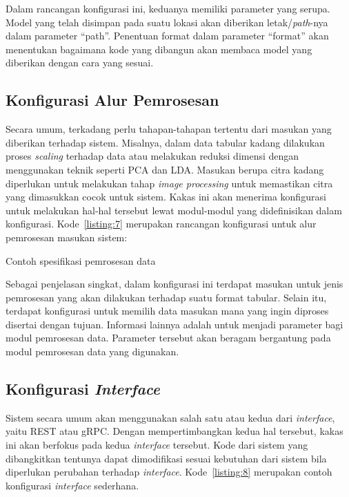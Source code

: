 Dalam rancangan konfigurasi ini, keduanya memiliki parameter yang serupa.
Model yang telah disimpan pada suatu lokasi akan diberikan letak/\textit{path}-nya dalam parameter ``path''.
Penentuan format dalam parameter ``format'' akan menentukan bagaimana kode yang dibangun akan membaca model yang diberikan dengan cara yang sesuai.

\subsection{Konfigurasi Alur Pemrosesan}\label{section:03-processing-pipeline}

Secara umum, terkadang perlu tahapan-tahapan tertentu dari masukan yang diberikan terhadap sistem.
Misalnya, dalam data tabular kadang dilakukan proses \textit{scaling} terhadap data atau melakukan reduksi dimensi dengan menggunakan teknik seperti PCA dan LDA.\@
Masukan berupa citra kadang diperlukan untuk melakukan tahap \textit{image processing} untuk memastikan citra yang dimasukkan cocok untuk sistem.
Kakas ini akan menerima konfigurasi untuk melakukan hal-hal tersebut lewat modul-modul yang didefinisikan dalam konfigurasi.
Kode~\ref{listing:7} merupakan rancangan konfigurasi untuk alur pemrosesan masukan sistem:

\begin{code}
	\caption{Contoh spesifikasi pemrosesan data}\label{listing:7}
\end{code}

Sebagai penjelasan singkat, dalam konfigurasi ini terdapat masukan untuk jenis pemrosesan yang akan dilakukan terhadap suatu format tabular.
Selain itu, terdapat konfigurasi untuk memilih data masukan mana yang ingin diproses disertai dengan tujuan.
Informasi lainnya adalah untuk menjadi parameter bagi modul pemrosesan data.
Parameter tersebut akan beragam bergantung pada modul pemrosesan data yang digunakan.

\subsection{Konfigurasi \textit{Interface}}\label{section:03-interface-config}
Sistem secara umum akan menggunakan salah satu atau kedua dari \textit{interface}, yaitu REST atau gRPC.\@
Dengan mempertimbangkan kedua hal tersebut, kakas ini akan berfokus pada kedua \textit{interface} tersebut.
Kode dari sistem yang dibangkitkan tentunya dapat dimodifikasi sesuai kebutuhan dari sistem bila diperlukan perubahan terhadap \textit{interface}.
Kode~\ref{listing:8} merupakan contoh konfigurasi \textit{interface} sederhana.

